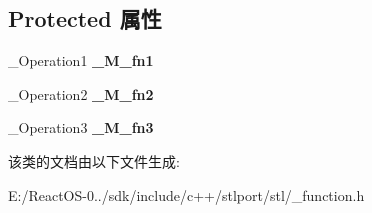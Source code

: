 \subsection*{Protected 属性}
\begin{DoxyCompactItemize}
\item 
\mbox{\label{classbinary__compose_a20f5c7ddcce00b852c5a822ff082d74c}} 
\+\_\+\+Operation1 {\bfseries \+\_\+\+M\+\_\+fn1}
\item 
\mbox{\label{classbinary__compose_aec1e22cc0d1aa77ae380671c53e73e9b}} 
\+\_\+\+Operation2 {\bfseries \+\_\+\+M\+\_\+fn2}
\item 
\mbox{\label{classbinary__compose_a00b5e3e5305ab6a1208fed61b28436f9}} 
\+\_\+\+Operation3 {\bfseries \+\_\+\+M\+\_\+fn3}
\end{DoxyCompactItemize}


该类的文档由以下文件生成\+:\begin{DoxyCompactItemize}
\item 
E\+:/\+React\+O\+S-\/0../sdk/include/c++/stlport/stl/\+\_\+function.\+h\end{DoxyCompactItemize}

